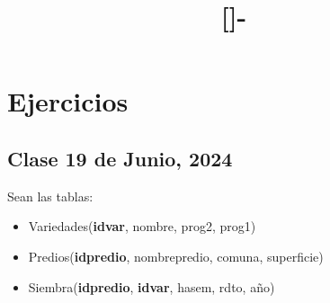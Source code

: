 \documentclass{templateNote}
\begin{document}

\title{[\asignatura]-\titulo}
\author{
    \autor
}
\portada
\margenes %

\section{Ejercicios}
\subsection{Clase 19 de Junio, 2024}
Sean las tablas:
\begin{itemize}
    \item Variedades(\textbf{idvar}, nombre, prog2, prog1)
    \item Predios(\textbf{idpredio}, nombrepredio, comuna, superficie)
    \item Siembra(\textbf{idpredio}, \textbf{idvar}, hasem, rdto, a\~no)
\end{itemize}
\end{document}
